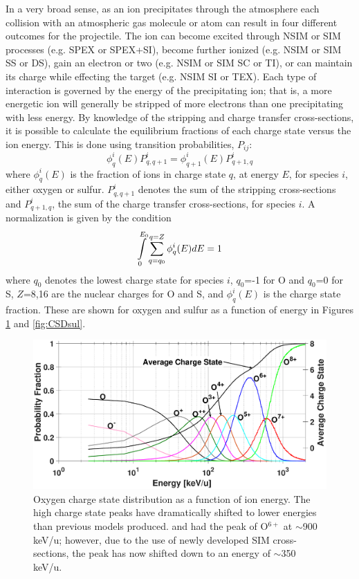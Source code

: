 \documentclass[draft]{agujournal2018}
\begin{document}
In a very broad sense, as an ion precipitates through the atmosphere each collision with an atmospheric gas molecule or atom can result in four different outcomes for the projectile.
The ion can become excited through NSIM or SIM processes (e.g. SPEX or SPEX+SI), become further ionized (e.g. NSIM or SIM SS or DS), gain an electron or two (e.g. NSIM or SIM SC or TI), or can maintain its charge while effecting the target (e.g. NSIM SI or TEX).
Each type of interaction is governed by the energy of the precipitating ion; that is, a more energetic ion will generally be stripped of more electrons than one precipitating with less energy.
By knowledge of the stripping and charge transfer cross-sections, it is possible to calculate the equilibrium fractions of each charge state versus the ion energy.
This is done using transition probabilities, $P_{ij}$:
\begin{equation}
    \phi_{q}^{i}(E) P^i_{q,q+1}=\phi_{q+1}^{i}(E) P^i_{q+1,q}
    \label{eqn:EqProb}
\end{equation}
where $\phi_q^i(E)$ is the fraction of ions in charge state $q$, at energy $E$, for species $i$, either oxygen or sulfur.
$P^i_{q,q+1}$ denotes the sum of the stripping cross-sections and $P^i_{q+1,q}$, the sum of the charge transfer cross-sections, for species $i$.
A normalization is given by the condition
\begin{equation}
    \int\displaylimits_{0}^{E_0}\sum_{q=q_0}^{q=Z}\phi^i_q(E)dE=1
    \label{eqn:EqProbNorm}
\end{equation}
where $q_0$ denotes the lowest charge state for species $i$, $q_0$=-1 for O and $q_0$=0 for S, $Z$=8,16 are the nuclear charges for O and S, and $\phi_q^i(E)$ is the charge state fraction.
These are shown for oxygen and sulfur as a function of energy in Figures \ref{fig:CSDoxy} and \ref{fig:CSDsul}.

\begin{figure}[ht]
    \centering
    \includegraphics[width=\textwidth]{Figures/CSDoxy.eps}
    \caption{Oxygen charge state distribution as a function of ion energy. The high charge state peaks have dramatically shifted to lower energies than previous models produced. \citet{houston2018} and \citet{ozak2010} had the peak of O$^{6+}$ at $\sim$900 keV/u; however, due to the use of newly developed SIM cross-sections, the peak has now shifted down to an energy of $\sim$350 keV/u.}
    \label{fig:CSDoxy}
\end{figure}
\end{document}

